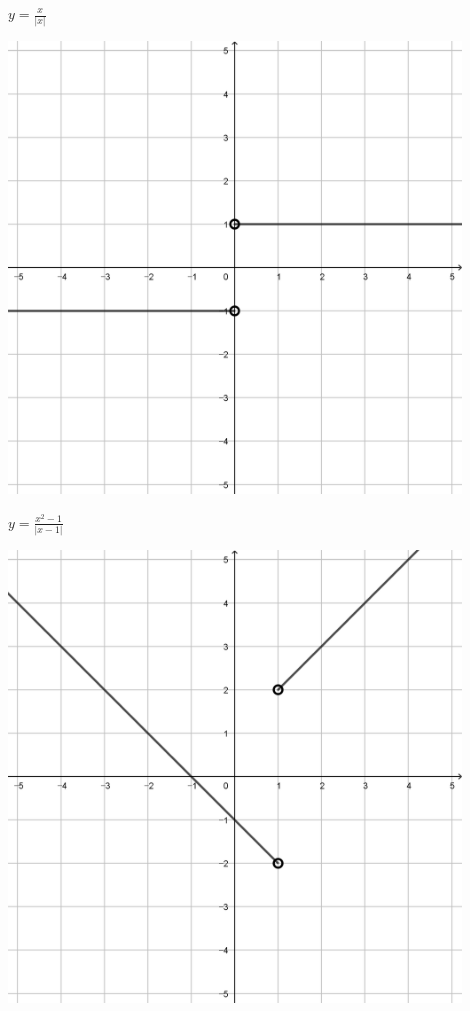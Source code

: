 \documentclass[a4paper]{oblivoir}
\begin{document}
\begin{minipage}{0.45\textwidth}\centering
\(y=\frac{x}{|x|}\)
\par\bigskip\includegraphics[width=0.9\textwidth]{img/3_piecewise_27}
\end{minipage}
\begin{minipage}{0.45\textwidth}\centering
\(y=\frac{x^2-1}{|x-1|}\)
\par\bigskip\includegraphics[width=0.9\textwidth]{img/3_piecewise_28}
\end{minipage}\bigskip\bigskip\par
\end{document}
